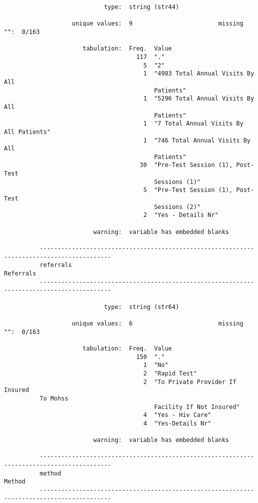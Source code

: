 \documentclass{article}
\begin{document}
\begin{verbatim}
                            type:  string (str44)
          
                   unique values:  9                        missing "":  0/163
          
                      tabulation:  Freq.  Value
                                     117  "."
                                       5  "2"
                                       1  "4983 Total Annual Visits By All
                                          Patients"
                                       1  "5296 Total Annual Visits By All
                                          Patients"
                                       1  "7 Total Annual Visits By All Patients"
                                       1  "746 Total Annual Visits By All
                                          Patients"
                                      30  "Pre-Test Session (1), Post-Test
                                          Sessions (1)"
                                       5  "Pre-Test Session (1), Post-Test
                                          Sessions (2)"
                                       2  "Yes - Details Nr"
          
                         warning:  variable has embedded blanks
          
          ------------------------------------------------------------------------------------------
          referrals                                                                        Referrals
          ------------------------------------------------------------------------------------------
          
                            type:  string (str64)
          
                   unique values:  6                        missing "":  0/163
          
                      tabulation:  Freq.  Value
                                     150  "."
                                       1  "No"
                                       2  "Rapid Test"
                                       2  "To Private Provider If Insured
          To Mohss
                                          Facility If Not Insured"
                                       4  "Yes - Hiv Care"
                                       4  "Yes-Details Nr"
          
                         warning:  variable has embedded blanks
          
          ------------------------------------------------------------------------------------------
          method                                                                              Method
          ------------------------------------------------------------------------------------------
          

\end{verbatim}
\end{document}
